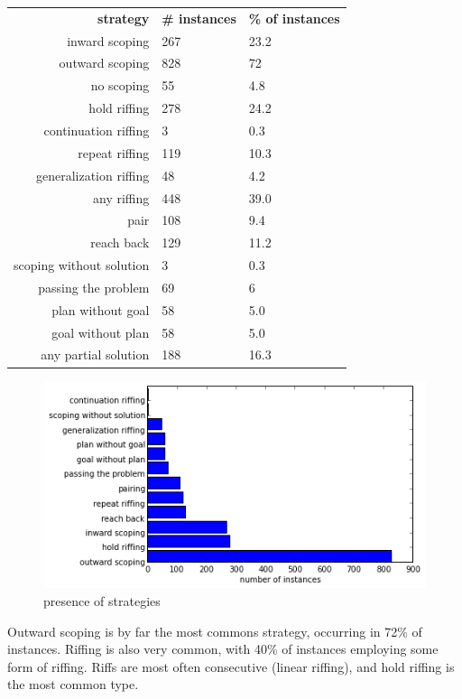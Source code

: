\begin{table}
    \begin{tabular}{r | l l}
        \textbf{strategy} & \textbf{\# instances} & \textbf{\% of instances} \\
        inward scoping & 267 & 23.2 \\
        outward scoping & 828 & 72 \\
        no scoping & 55 & 4.8 \\
        \hline \hline
        hold riffing & 278 & 24.2 \\
        continuation riffing & 3 & 0.3 \\
        repeat riffing & 119 & 10.3 \\
        generalization riffing & 48 & 4.2 \\
        \hline
        any riffing & 448 & 39.0 \\
        pair & 108 & 9.4 \\
        reach back & 129 & 11.2 \\
        \hline \hline
        scoping without solution & 3 & 0.3 \\
        passing the problem & 69 & 6 \\
        plan without goal & 58 & 5.0 \\
        goal without plan & 58 & 5.0 \\ 
        \hline
        any partial solution & 188 & 16.3 \\
    \end{tabular}
\end{table}

\begin{figure}[h!]
    \centering
    \includegraphics[width=0.9\columnwidth]{strategy_counts}
    \caption{presence of strategies}
    \label{fig:strategy_counts}
\end{figure}

Outward scoping is by far the most commons strategy, occurring in 72\% of instances. Riffing is also very common, with 40\% of instances employing some form of riffing. Riffs are most often consecutive (linear riffing), and hold riffing is the most common type.

